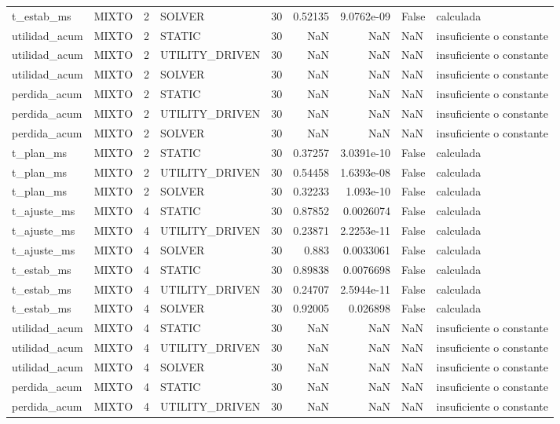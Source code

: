 \begin{tabular}{llrlrrrll}
t_estab_ms & MIXTO & 2 & SOLVER & 30 & 0.52135 & 9.0762e-09 & False & calculada \\
utilidad_acum & MIXTO & 2 & STATIC & 30 & NaN & NaN & NaN & insuficiente o constante \\
utilidad_acum & MIXTO & 2 & UTILITY_DRIVEN & 30 & NaN & NaN & NaN & insuficiente o constante \\
utilidad_acum & MIXTO & 2 & SOLVER & 30 & NaN & NaN & NaN & insuficiente o constante \\
perdida_acum & MIXTO & 2 & STATIC & 30 & NaN & NaN & NaN & insuficiente o constante \\
perdida_acum & MIXTO & 2 & UTILITY_DRIVEN & 30 & NaN & NaN & NaN & insuficiente o constante \\
perdida_acum & MIXTO & 2 & SOLVER & 30 & NaN & NaN & NaN & insuficiente o constante \\
t_plan_ms & MIXTO & 2 & STATIC & 30 & 0.37257 & 3.0391e-10 & False & calculada \\
t_plan_ms & MIXTO & 2 & UTILITY_DRIVEN & 30 & 0.54458 & 1.6393e-08 & False & calculada \\
t_plan_ms & MIXTO & 2 & SOLVER & 30 & 0.32233 & 1.093e-10 & False & calculada \\
t_ajuste_ms & MIXTO & 4 & STATIC & 30 & 0.87852 & 0.0026074 & False & calculada \\
t_ajuste_ms & MIXTO & 4 & UTILITY_DRIVEN & 30 & 0.23871 & 2.2253e-11 & False & calculada \\
t_ajuste_ms & MIXTO & 4 & SOLVER & 30 & 0.883 & 0.0033061 & False & calculada \\
t_estab_ms & MIXTO & 4 & STATIC & 30 & 0.89838 & 0.0076698 & False & calculada \\
t_estab_ms & MIXTO & 4 & UTILITY_DRIVEN & 30 & 0.24707 & 2.5944e-11 & False & calculada \\
t_estab_ms & MIXTO & 4 & SOLVER & 30 & 0.92005 & 0.026898 & False & calculada \\
utilidad_acum & MIXTO & 4 & STATIC & 30 & NaN & NaN & NaN & insuficiente o constante \\
utilidad_acum & MIXTO & 4 & UTILITY_DRIVEN & 30 & NaN & NaN & NaN & insuficiente o constante \\
utilidad_acum & MIXTO & 4 & SOLVER & 30 & NaN & NaN & NaN & insuficiente o constante \\
perdida_acum & MIXTO & 4 & STATIC & 30 & NaN & NaN & NaN & insuficiente o constante \\
perdida_acum & MIXTO & 4 & UTILITY_DRIVEN & 30 & NaN & NaN & NaN & insuficiente o constante \\

\end{tabular}
